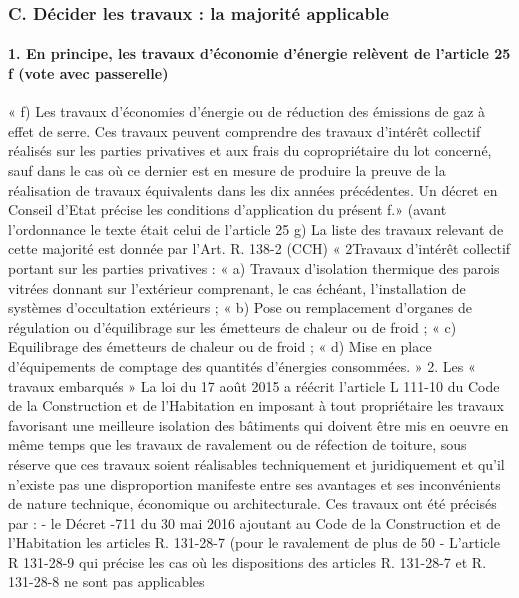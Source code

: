 		\subsubsection{C. Décider les travaux : la majorité applicable}
		
		\paragraph{1. En principe, les travaux d’économie d’énergie relèvent de l’article 25 f (vote avec passerelle)}
		
		« f) Les travaux d'économies d'énergie ou de réduction des émissions de gaz à effet de serre. Ces travaux peuvent comprendre des travaux d'intérêt collectif réalisés sur les parties privatives et aux frais du copropriétaire du lot concerné, sauf dans le cas où ce dernier est en mesure de produire la preuve de la réalisation de travaux équivalents dans les dix années précédentes.
		Un décret en Conseil d'Etat précise les conditions d'application du présent f.» (avant l’ordonnance le texte était celui de l’article 25 g)
		La liste des travaux relevant de cette majorité est donnée par l’Art. R. 138-2 (CCH)
		« 2\degres Travaux d'intérêt collectif portant sur les parties privatives : « a) Travaux d'isolation thermique des parois vitrées donnant sur l'extérieur comprenant, le cas échéant, l'installation de systèmes d'occultation extérieurs ; « b) Pose ou remplacement d'organes de régulation ou d'équilibrage sur les émetteurs de chaleur ou de froid ; « c) Equilibrage des émetteurs de chaleur ou de froid ; « d) Mise en place d'équipements de comptage des quantités d'énergies consommées. »
		2. Les « travaux embarqués »
		La loi du 17 août 2015 a réécrit l’article L 111-10 du Code de la Construction et de l'Habitation en imposant à tout propriétaire les travaux favorisant une meilleure isolation des bâtiments qui doivent être mis en oeuvre en même temps que les travaux de ravalement ou de réfection de toiture, sous réserve que ces travaux soient réalisables techniquement et juridiquement et qu’il n’existe pas une disproportion manifeste entre ses avantages et ses inconvénients de nature technique, économique ou architecturale.
		Ces travaux ont été précisés par :
		- le Décret -711 du 30 mai 2016 ajoutant au Code de la Construction et de l'Habitation les articles R. 131-28-7 (pour le ravalement de plus de 50 %
		- L’article R 131-28-9 qui précise les cas où les dispositions des articles R. 131-28-7 et R. 131-28-8 ne sont pas applicables
